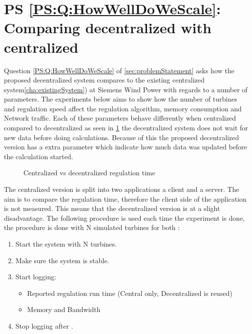 \section{PS \ref{PS:Q:HowWellDoWeScale}: Comparing decentralized with centralized}
Question \ref{PS:Q:HowWellDoWeScale} of \cref{sec:problemStatement} asks how the proposed decentralized system compares to the existing centralized system\cref{cha:existingSystem}) at Siemens Wind Power with regards to a number of parameters.
The experiments below aims to show how the number of turbines and regulation speed affect the regulation algorithm, memory consumption and Network traffic.
Each of these parameters behave differently when centralized compared to decentralized as seen in \cref{fig:timingCentralVSDecentral} the decentralized system does not wait for new data before doing calculations. Because of this the proposed decentralized version has a extra parameter which indicate how much data was updated before the calculation started.

\begin{figure}[b]
	\centering
	{}
	
	\newline
	
	{}
	
	\caption{Centralized vs decentralized regulation time}
	\label{fig:timingCentralVSDecentral}
\end{figure}

	The centralized version is split into two applications a client and a server.
	The aim is to compare the regulation time, therefore the client side of the application is not measured. This means that the decentralized version is at a slight disadvantage.
	The following procedure is used each time the experiment is done, the procedure is done with N simulated turbines for both :

\begin{minipage}{\textwidth}
	\begin{enumerate}
		\item Start the system with N turbines.
		\item Make sure the system is stable.
		\item Start logging:
		\begin{itemize}
			\item Reported regulation run time (Central only, Decentralized is reused)
			\item Memory and Bandwidth
		\end{itemize}
		\item Stop logging after \experiemntRunTime.
		\end{enumerate}
\end{minipage}
